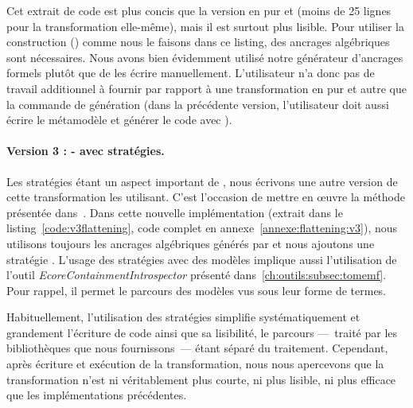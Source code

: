 Cet extrait de code est plus concis que la version en pur {\java} et
{\emf} (moins de 25 lignes pour la transformation elle-même), mais il est
surtout plus lisible. Pour utiliser la construction  ()
comme nous le faisons dans ce listing, des ancrages algébriques sont
nécessaires. Nous avons bien évidemment utilisé notre générateur d'ancrages
formels {\tomemf} plutôt que de les écrire manuellement.  L'utilisateur n'a
donc pas de travail additionnel à fournir par rapport à une transformation en
pur {\java} et {\emf} autre que la commande de génération (dans la précédente
version, l'utilisateur doit aussi écrire le métamodèle et générer le code
{\emf} avec {\eclipse}).


\paragraph{Version 3 : {\tomjava-\emf} avec stratégies.}
Les stratégies étant un aspect important de {\tom}, nous écrivons une autre
version de cette transformation les utilisant. C'est l'occasion de mettre en
œuvre la méthode présentée dans~\cite{Bach2012}. Dans cette nouvelle
implémentation (extrait dans le listing~\ref{code:v3flattening}, code complet
en annexe~\ref{annexe:flattening:v3}), nous utilisons toujours les ancrages
algébriques générés par {\tomemf} et nous ajoutons une stratégie {\tom}.
L'usage des stratégies avec des modèles {\emf \ecore} implique aussi
l'utilisation de l'outil \emph{EcoreContainmentIntrospector} présenté
dans~\ref{ch:outils:subsec:tomemf}. Pour rappel, il permet le parcours des
modèles {\emf \ecore} vus sous leur forme de termes.

\begin{figure}[h]
  \begin{center}
    
  \end{center}
\end{figure}

Habituellement, l'utilisation des stratégies {\tom} simplifie systématiquement
et grandement l'écriture de code ainsi que sa lisibilité, le parcours
---~traité par les bibliothèques que nous fournissons~--- étant séparé du
traitement. Cependant, après écriture et exécution de la transformation, nous
nous apercevons que la transformation n'est ni véritablement plus courte, ni
plus lisible, ni plus efficace que les implémentations précédentes. 

